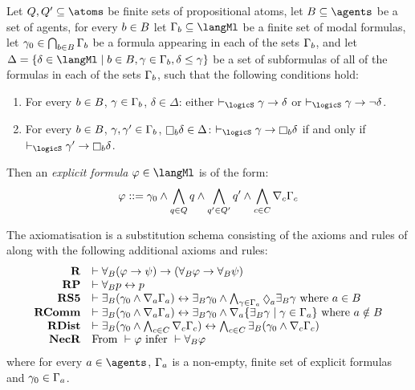 \begin{definition}
Let $\atomsQ, \atomsQ' \subseteq \atoms$ be finite sets of propositional atoms,
let $\agentsB \subseteq \agents$ be a set of agents,
for every $b \in B$ let $\Gamma_\agentB \subseteq \langMl$ be a finite set of modal formulas,
let $\gamma_0 \in \bigcap_{b \in B} \Gamma_b$ be a formula appearing in each of the sets $\Gamma_b$, and
let $\Delta = \{\delta \in \langMl \mid \agentB \in \agentsB, \gamma \in \Gamma_\agentB, \delta \leq \gamma\}$ be a set of subformulas of all of the formulas in each of the sets $\Gamma_b$,
such that the following conditions hold:
\begin{enumerate}
    \item For every $b \in B$, $\gamma \in \Gamma_b$, $\delta \in \Delta$: either $\proves_\logicS \gamma \implies \delta$ or $\proves_\logicS \gamma \implies \lnot \delta$.
    \item For every $b \in B$, $\gamma, \gamma' \in \Gamma_b$, $\necessaryB \delta \in \Delta$: $\proves_\logicS \gamma \implies \necessaryB \delta$ if and only if $\proves_\logicS \gamma' \implies \necessaryB \delta$.
\end{enumerate}
Then an {\em explicit formula} $\phi \in \langMl$ is of the form:
$$
\varphi ::= \gamma_0 \land \bigwedge_{q \in Q} q \land \bigwedge_{q' \in Q'} q' \land \bigwedge_{c \in C} \nabla_{c} \Gamma_c
$$
\end{definition}

\begin{definition}
    The axiomatisation \axiomRmlS{} is a substitution schema consisting of the axioms and rules of \axiomS{} along with the following additional axioms and rules:
$$
\begin{array}{rl}
    {\bf R} & \proves \allrefsBs (\phi \implies \psi) \implies (\allrefsBs \phi \implies \allrefsBs \psi)\\
    {\bf RP} & \proves \allrefsBs \atomP \iff \atomP\\
    {\bf RS5} & \proves \somerefsBs (\gamma_0 \land \coversA \Gamma_\agentA) \iff \somerefsBs \gamma_0 \land \bigwedge_{\gamma \in \Gamma_\agentA} \possibleA \somerefsBs \gamma \text{ where } \agentA \in \agentsB\\
    {\bf RComm} & \proves \somerefsBs (\gamma_0 \land \coversA \Gamma_\agentA) \iff \somerefsBs \gamma_0 \land \coversA \{\somerefsBs \gamma \mid \gamma \in \Gamma_\agentA\} \text{ where } \agentA \notin \agentsB\\
    {\bf RDist} & \proves \somerefsBs (\gamma_0 \land \bigwedge_{\agentC \in \agentsC} \coversC \Gamma_\agentC) \iff \bigwedge_{\agentC \in \agentsC} \somerefsBs (\gamma_0 \land \coversC \Gamma_\agentC)\\
    {\bf NecR} & \text{From } \proves \phi \text{ infer } \proves \allrefsBs \phi
\end{array}
$$
where for every $\agentA \in \agents$, $\Gamma_a$ is a non-empty, finite set of explicit formulas and $\gamma_0 \in \Gamma_a$.
\end{definition}

